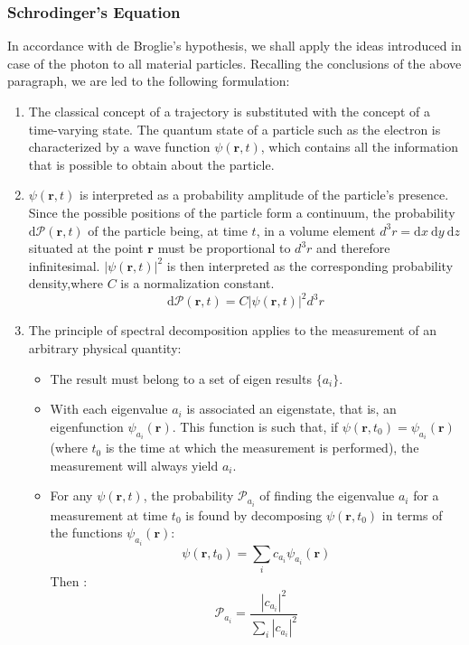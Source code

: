 \documentclass[%
 reprint,
 amsmath,amssymb,
 aps,
]{revtex4-2}
\begin{document}
\subsubsection{Schrodinger's Equation}
In accordance with de Broglie's hypothesis, we shall apply the ideas introduced in case of the photon to all material particles. Recalling the conclusions of the above paragraph, we are led to the following formulation:
\begin{enumerate}
\item The classical concept of a trajectory is substituted with the concept of a time-varying state. The quantum state of a particle such as the electron is characterized by a wave function $\psi(\mathbf{r}, t)$, which contains all the information that is possible to obtain about the particle.
\item $\psi(\mathbf{r}, t)$ is interpreted as a probability amplitude of the particle's presence. Since the possible positions of the particle form a continuum, the probability $\mathrm{d} \mathscr{P}(\mathbf{r}, t)$ of the particle being, at time $t$, in a volume element $d^3 r=\mathrm{d} x \mathrm{~d} y \mathrm{~d} z$ situated at the point $\mathbf{r}$ must be proportional to $d^3 r$ and therefore infinitesimal. $|\psi(\mathbf{r}, t)|^2$ is then interpreted as the corresponding probability density,where $C$ is a normalization constant.
$$
\mathrm{d} \mathscr{P}(\mathbf{r}, t)=C|\psi(\mathbf{r}, t)|^2 d^3 r
$$
\item The principle of spectral decomposition applies to the measurement of an arbitrary physical quantity:
 \begin{itemize}
     \item The result must belong to a set of eigen results $\{a_i\}$.
     \item With each eigenvalue $a_i$ is associated an eigenstate, that is, an eigenfunction $\psi_{a_{i}}(\mathbf{r})$. This function is such that, if $\psi\left(\mathbf{r}, t_0\right)=\psi_{a_{i}}(\mathbf{r})$ (where $t_0$ is the time at which the measurement is performed), the measurement will always yield $a_i$.
     \item For any $\psi(\mathbf{r}, t)$, the probability $\mathscr{P}_{a_{i}}$ of finding the eigenvalue $a_i$ for a measurement at time $t_0$ is found by decomposing $\psi\left(\mathbf{r}, t_0\right)$ in terms of the functions $\psi_{a_{i}}(\mathbf{r}):$
$$
\psi\left(\mathbf{r}, t_0\right)=\sum_i c_{a_{i}} \psi_{a_{i}}(\mathbf{r})
$$
Then :
$$
\mathscr{P}_{a_{i}}=\frac{\left|c_{a_{i}}\right|^2}{\sum_i\left|c_{a_{i}}\right|^2}
$$
\end{itemize}
\end{enumerate}
\end{document}
